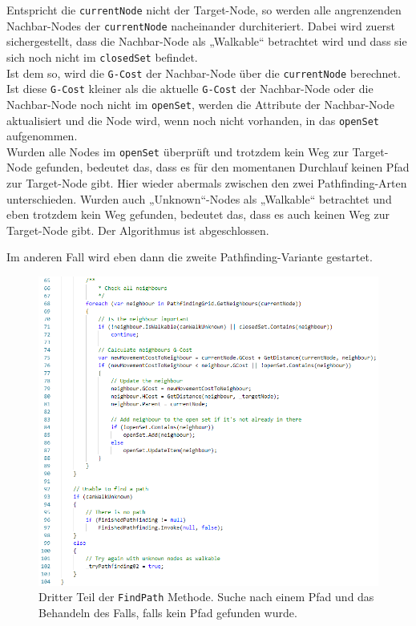 \documentclass[a4paper,12pt]{article}
\newcommand{\code}{\texttt}
\begin{document}
Entspricht die \code{currentNode} nicht der Target-Node, so werden alle angrenzenden Nachbar-Nodes der \code{currentNode} nacheinander durchiteriert. Dabei wird zuerst sichergestellt, dass die Nachbar-Node als „Walkable“ betrachtet wird und dass sie sich noch nicht im \code{closedSet} befindet.
\\[0.4cm]
Ist dem so, wird die \code{G-Cost} der Nachbar-Node über die \code{currentNode} berechnet. Ist diese \code{G-Cost} kleiner als die aktuelle \code{G-Cost} der Nachbar-Node oder die Nachbar-Node noch nicht im \code{openSet}, werden die Attribute der Nachbar-Node aktualisiert und die Node wird, wenn noch nicht vorhanden, in das \code{openSet} aufgenommen.
\\[0.4cm]
Wurden alle Nodes im \code{openSet} überprüft und trotzdem kein Weg zur Target-Node gefunden, bedeutet das, dass es für den momentanen Durchlauf keinen Pfad zur Target-Node gibt. Hier wieder abermals zwischen den zwei Pathfinding-Arten unterschieden. Wurden auch „Unknown“-Nodes als „Walkable“ betrachtet und eben trotzdem kein Weg gefunden, bedeutet das, dass es auch keinen Weg zur Target-Node gibt. Der Algorithmus ist abgeschlossen. 

Im anderen Fall wird eben dann die zweite Pathfinding-Variante gestartet.
\begin{figure}[H]
    \centering
    \includegraphics[width=1\linewidth]{Bilder/Aufgabe3/Teilaufgabe_C/Pathfinding_03.png}
    \caption{Dritter Teil der \code{FindPath} Methode. Suche nach einem Pfad und das Behandeln des Falls, falls kein Pfad gefunden wurde.}
\end{figure}
\end{document}
